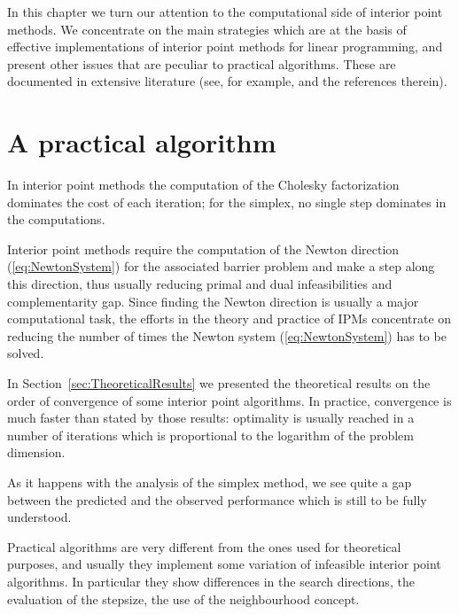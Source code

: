 
%
%
\label{ch:PracticalIpm}

In this chapter we turn our attention to the computational side of
interior point methods. We concentrate on the main strategies which are
at the basis of effective implementations of interior point methods
for linear programming, and present other issues that are peculiar 
to practical algorithms.
These are documented in extensive literature (see, for example, 
\cite{AndersenGondzioMeszarosXu,GondzioTerlaky} and the references therein).


%
%
\section{A practical algorithm}

In interior point methods the computation of the Cholesky factorization
dominates the cost of each iteration; for the simplex, no single
step dominates in the computations. 

Interior point methods require the computation of the Newton 
direction (\ref{eq:NewtonSystem})
for the associated barrier problem and make a step along 
this direction, thus usually reducing primal and dual infeasibilities 
and complementarity gap.
Since finding the Newton direction is usually a major computational task, 
the efforts in the theory and practice of IPMs concentrate on reducing 
the number of times the Newton system (\ref{eq:NewtonSystem}) has to be solved.

In Section~\ref{sec:TheoreticalResults} we presented the theoretical
results on the order of convergence of some interior point algorithms.
In practice, convergence is much faster than stated by those results:
optimality is usually reached in a number of iterations which is 
proportional to the logarithm of the problem dimension. 


As it happens with the analysis of the simplex method, we see quite
a gap between the predicted and the observed performance which is still to
be fully understood.

Practical algorithms are very different from the ones used for
theoretical purposes, and usually they implement some variation
of infeasible interior point algorithms. In particular they show
differences in the search directions, the evaluation of the stepsize, 
the use of the neighbourhood concept. 

